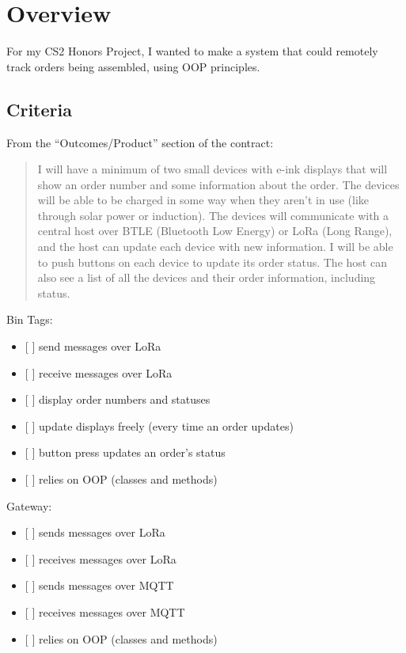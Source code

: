 \documentclass{article}
\date{}
\begin{document}
\section{Overview}\label{overview}

For my CS2 Honors Project, I wanted to make a system that could remotely
track orders being assembled, using OOP principles.~

\subsection{Criteria}\label{criteria}

From the ``Outcomes/Product'' section of the contract:~

\begin{quote}
I will have a minimum of two small devices with e-ink displays that will
show an order number and some information about the order. The devices
will be able to be charged in some way when they aren't in use (like
through solar power or induction). The devices will communicate with a
central host over BTLE (Bluetooth Low Energy) or LoRa (Long Range), and
the host can update each device with new information. I will be able to
push buttons on each device to update its order status. The host can
also see a list of all the devices and their order information,
including status.
\end{quote}

Bin Tags:

\begin{itemize}
\item
  {[} {]} send messages over LoRa
\item
  {[} {]} receive messages over LoRa
\item
  {[} {]} display order numbers and statuses
\item
  {[} {]} update displays freely (every time an order updates)
\item
  {[} {]} button press updates an order's status
\item
  {[} {]} relies on OOP (classes and methods)
\end{itemize}

Gateway:

\begin{itemize}
\item
  {[} {]} sends messages over LoRa
\item
  {[} {]} receives messages over LoRa
\item
  {[} {]} sends messages over MQTT
\item
  {[} {]} receives messages over MQTT
\item
  {[} {]} relies on OOP (classes and methods)
\end{itemize}
\end{document}

